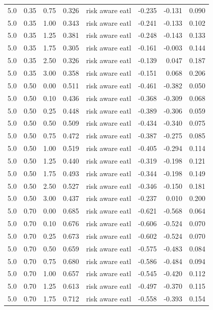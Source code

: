 \begin{longtable}{rrrrlrrr}
5.0 & 0.35 & 0.75 & 0.326 & risk aware eatl & -0.235 & -0.131 & 0.090 \\
5.0 & 0.35 & 1.00 & 0.343 & risk aware eatl & -0.241 & -0.133 & 0.102 \\
5.0 & 0.35 & 1.25 & 0.381 & risk aware eatl & -0.248 & -0.143 & 0.133 \\
5.0 & 0.35 & 1.75 & 0.305 & risk aware eatl & -0.161 & -0.003 & 0.144 \\
5.0 & 0.35 & 2.50 & 0.326 & risk aware eatl & -0.139 & 0.047 & 0.187 \\
5.0 & 0.35 & 3.00 & 0.358 & risk aware eatl & -0.151 & 0.068 & 0.206 \\
5.0 & 0.50 & 0.00 & 0.511 & risk aware eatl & -0.461 & -0.382 & 0.050 \\
5.0 & 0.50 & 0.10 & 0.436 & risk aware eatl & -0.368 & -0.309 & 0.068 \\
5.0 & 0.50 & 0.25 & 0.448 & risk aware eatl & -0.389 & -0.306 & 0.059 \\
5.0 & 0.50 & 0.50 & 0.509 & risk aware eatl & -0.434 & -0.340 & 0.075 \\
5.0 & 0.50 & 0.75 & 0.472 & risk aware eatl & -0.387 & -0.275 & 0.085 \\
5.0 & 0.50 & 1.00 & 0.519 & risk aware eatl & -0.405 & -0.294 & 0.114 \\
5.0 & 0.50 & 1.25 & 0.440 & risk aware eatl & -0.319 & -0.198 & 0.121 \\
5.0 & 0.50 & 1.75 & 0.493 & risk aware eatl & -0.344 & -0.198 & 0.149 \\
5.0 & 0.50 & 2.50 & 0.527 & risk aware eatl & -0.346 & -0.150 & 0.181 \\
5.0 & 0.50 & 3.00 & 0.437 & risk aware eatl & -0.237 & 0.010 & 0.200 \\
5.0 & 0.70 & 0.00 & 0.685 & risk aware eatl & -0.621 & -0.568 & 0.064 \\
5.0 & 0.70 & 0.10 & 0.676 & risk aware eatl & -0.606 & -0.524 & 0.070 \\
5.0 & 0.70 & 0.25 & 0.673 & risk aware eatl & -0.602 & -0.524 & 0.070 \\
5.0 & 0.70 & 0.50 & 0.659 & risk aware eatl & -0.575 & -0.483 & 0.084 \\
5.0 & 0.70 & 0.75 & 0.680 & risk aware eatl & -0.586 & -0.484 & 0.094 \\
5.0 & 0.70 & 1.00 & 0.657 & risk aware eatl & -0.545 & -0.420 & 0.112 \\
5.0 & 0.70 & 1.25 & 0.613 & risk aware eatl & -0.497 & -0.370 & 0.115 \\
5.0 & 0.70 & 1.75 & 0.712 & risk aware eatl & -0.558 & -0.393 & 0.154 \\

\end{longtable}
